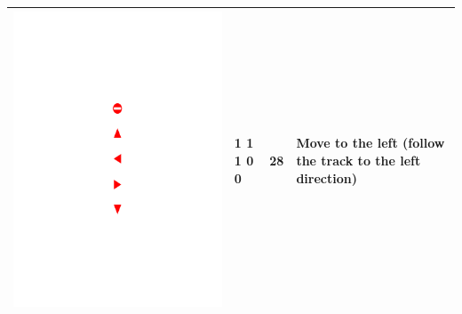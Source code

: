 \documentclass[a4paper,twoside]{article}
\begin{document}
\begin{table}[!h]
\begin{tabular}{|C{1.3cm}|C{1.3cm}|C{1.3cm}|C{2cm}|}
		\begin{minipage}{.075\textwidth}\includegraphics[scale=.5,trim=9.1cm 13.5cm 9.5cm 13cm,clip]{signs.pdf}\end{minipage}		& 1 1 1 0 0 & 28 & Move to the left (follow the track to the left direction) \\ \hline

\end{tabular}
\end{table}
\end{document}
